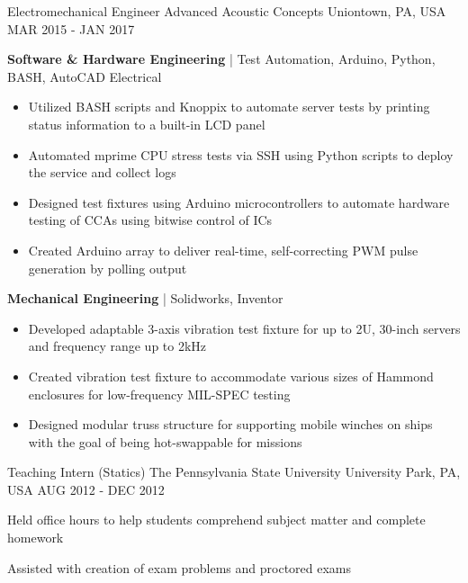 \begin{cventries}
	\cventry
	{Electromechanical Engineer} %
	{Advanced Acoustic Concepts} %
	{Uniontown, PA, USA} %
	{MAR 2015 - JAN 2017} %
	{
		\begin{cvitems} %
			\item {\textbf{Software \& Hardware Engineering} | {\color{awesome}Test Automation, Arduino, Python, BASH, AutoCAD Electrical}
				\begin{itemize}[noitemsep,wide=0pt, leftmargin=\dimexpr{} + 2\relax]
					\item[\textbullet]{Utilized BASH scripts and Knoppix to automate server tests by printing status information to a built-in LCD panel}
					\item[\textbullet]{Automated mprime CPU stress tests via SSH using Python scripts to deploy the service and collect logs}
					\item[\textbullet]{Designed test fixtures using Arduino microcontrollers to automate hardware testing of CCAs using bitwise control of ICs}
					\item[\textbullet]{Created Arduino array to deliver real-time, self-correcting PWM pulse generation  by polling output}
				\end{itemize}}
			\item {\textbf{Mechanical Engineering} | {\color{awesome}Solidworks, Inventor}
				\begin{itemize}[noitemsep,wide=0pt, leftmargin=\dimexpr{} + 2\relax]
					\item[\textbullet]{Developed adaptable 3-axis vibration test fixture for up to 2U, 30-inch servers and frequency range up to 2kHz}
					\item[\textbullet]{Created vibration test fixture to accommodate various sizes of Hammond enclosures for low-frequency MIL-SPEC testing}
					\item[\textbullet]{Designed modular truss structure for supporting mobile winches on ships with the goal of being hot-swappable for missions}
				\end{itemize}}
		\end{cvitems}
	}
	    
	\cventry
	{Teaching Intern (Statics)} %
	{The Pennsylvania State University} %
	{University Park, PA, USA} %
	{AUG 2012 - DEC 2012} %
	{
		\begin{cvitems} %
			\item {Held office hours to help students comprehend subject matter and complete homework}
			\item {Assisted with creation of exam problems and proctored exams}
		\end{cvitems}
	}
	
	
\end{cventries}